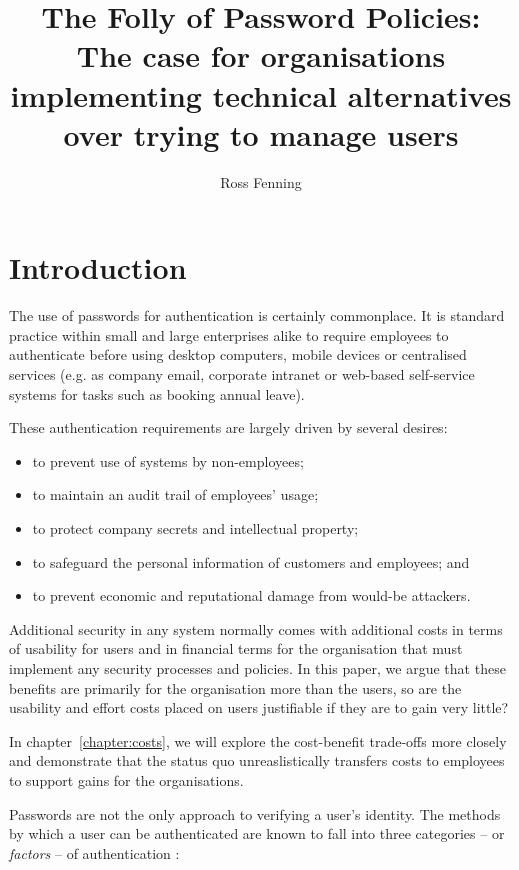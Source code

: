 \documentclass{report}
\title{The Folly of Password Policies: The case for organisations implementing technical alternatives over trying to manage users}
\author{Ross Fenning}
\begin{document}
\maketitle
\tableofcontents

\chapter{Introduction}

The use of passwords for authentication is certainly commonplace.
It is standard practice within small and large enterprises alike
to require employees to authenticate before using desktop
computers, mobile devices or centralised services (e.g.
as company email, corporate intranet or web-based self-service
systems for tasks such as booking annual leave).

These authentication requirements are largely driven by
several desires:

\begin{itemize}
  \item to prevent use of systems by non-employees;
  \item to maintain an audit trail of employees' usage;
  \item to protect company secrets and intellectual property;
  \item to safeguard the personal information of customers and employees; and
  \item to prevent economic and reputational damage from would-be attackers.
\end{itemize}

Additional security in any system normally comes with additional costs
in terms of usability for users and in financial terms for the organisation
that must implement any security processes and policies. In this paper, we
argue that these benefits are primarily for the organisation more than the
users, so are the usability and effort costs placed on users justifiable
if they are to gain very little?

In chapter~\ref{chapter:costs}, we will explore the
cost-benefit trade-offs more closely and demonstrate that the status
quo unreaslistically transfers costs to employees to support gains
for the organisations.

Passwords are not the only approach to verifying a user's identity.
The methods by which a user can be authenticated are known to fall
into three categories -- or \emph{factors} -- of authentication
\parencite{council2005authentication}:
\end{document}
